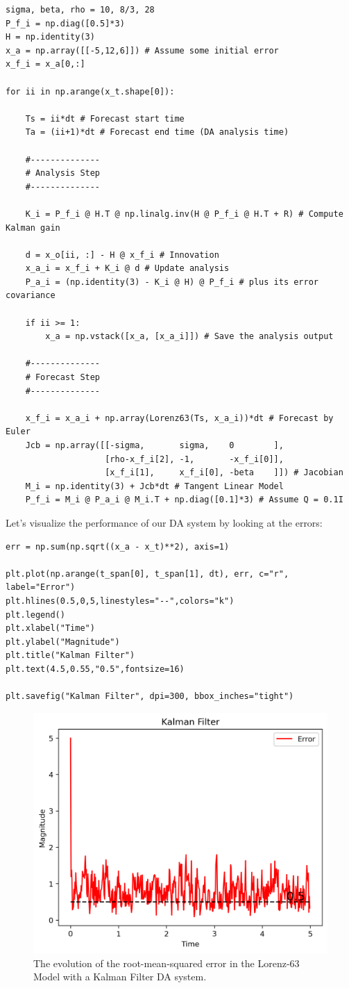 \begin{lstlisting}
sigma, beta, rho = 10, 8/3, 28
P_f_i = np.diag([0.5]*3)
H = np.identity(3)
x_a = np.array([[-5,12,6]]) # Assume some initial error
x_f_i = x_a[0,:]

for ii in np.arange(x_t.shape[0]):

    Ts = ii*dt # Forecast start time
    Ta = (ii+1)*dt # Forecast end time (DA analysis time)

    #--------------
    # Analysis Step
    #--------------

    K_i = P_f_i @ H.T @ np.linalg.inv(H @ P_f_i @ H.T + R) # Compute Kalman gain

    d = x_o[ii, :] - H @ x_f_i # Innovation
    x_a_i = x_f_i + K_i @ d # Update analysis
    P_a_i = (np.identity(3) - K_i @ H) @ P_f_i # plus its error covariance
    
    if ii >= 1:
        x_a = np.vstack([x_a, [x_a_i]]) # Save the analysis output

    #--------------
    # Forecast Step
    #--------------
    
    x_f_i = x_a_i + np.array(Lorenz63(Ts, x_a_i))*dt # Forecast by Euler
    Jcb = np.array([[-sigma,       sigma,    0        ],
                    [rho-x_f_i[2], -1,       -x_f_i[0]],
                    [x_f_i[1],     x_f_i[0], -beta    ]]) # Jacobian
    M_i = np.identity(3) + Jcb*dt # Tangent Linear Model
    P_f_i = M_i @ P_a_i @ M_i.T + np.diag([0.1]*3) # Assume Q = 0.1I
\end{lstlisting}
Let's visualize the performance of our DA system by looking at the errors:
\begin{lstlisting}
err = np.sum(np.sqrt((x_a - x_t)**2), axis=1)

plt.plot(np.arange(t_span[0], t_span[1], dt), err, c="r", label="Error")
plt.hlines(0.5,0,5,linestyles="--",colors="k")
plt.legend()
plt.xlabel("Time")
plt.ylabel("Magnitude")
plt.title("Kalman Filter")
plt.text(4.5,0.55,"0.5",fontsize=16)

plt.savefig("Kalman Filter", dpi=300, bbox_inches="tight")
\end{lstlisting}
\begin{figure}[h!]
    \centering
    \includegraphics[width=0.75\linewidth]{graphics/Kalman3.png}
    \caption{The evolution of the root-mean-squared error in the Lorenz-63 Model with a Kalman Filter DA system.}
    \label{fig:kalman3}
\end{figure}
